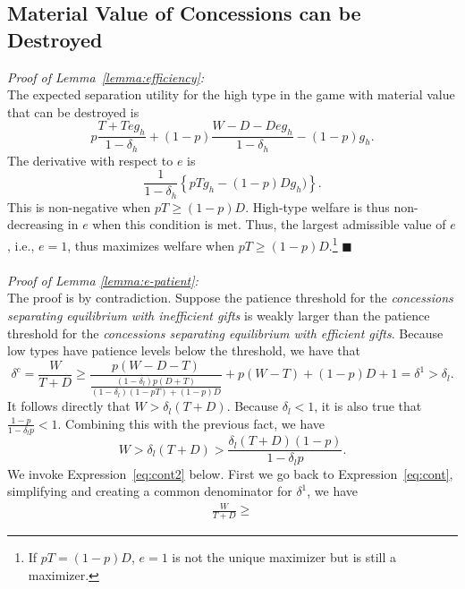 \documentclass[bibtex,autowc]{apsr_submission}
\newcommand{\de}{\delta}
\begin{document}
{\subsection{Material Value of Concessions can be Destroyed}
\emph{Proof of Lemma~\ref{lemma:efficiency}:}\\
The expected separation utility for the high type in the game with material value that can be destroyed is
$$p\frac{T+Teg_h}{1-\de_h} + (1-p)\frac{W-D-Deg_h}{1-\de_h} - (1-p)g_h.$$
The derivative with respect to $e$ is
$$\frac{1}{1-\de_h}\left\{pTg_h - (1-p)Dg_h)\right\}.$$
This is non-negative when $pT \geq (1-p)D$. High-type welfare is thus non-decreasing in $e$ when this condition is met. Thus, the largest admissible value of $e$, i.e., $e=1$, thus maximizes welfare when $pT \geq (1-p)D$.\footnote{If $pT = (1-p)D$, $e=1$ is not the unique maximizer but is still a maximizer.} \hfill $\blacksquare$\\
\\
\emph{Proof of Lemma \ref{lemma:e-patient}:}\\
The proof is by contradiction. Suppose the patience threshold for the \emph{concessions separating equilibrium with inefficient gifts} is weakly larger than the patience threshold for the \emph{concessions separating equilibrium with efficient gifts}. Because low types have patience levels below the threshold, we have that 
\begin{equation}
	\de^c = \frac{W}{T+D} \geq \frac{p(W-D-T)}{\frac{\left(1-\de_l\right)p\left(D +	 T\right)}{\left(1-\de_l\right)\left(1 - pT \right) + (1-p) D}} + p (W-T) + (1-p)D + 1 = \de^1> \de_l.
	\label{eq:cont}
\end{equation}
It follows directly that $W > \de_l(T+D)$. Because $\de_l < 1$, it is also true that $\frac{1-p}{1-\de_l p} < 1$. Combining this with the previous fact, we have
\begin{equation}
	W > \de_l(T+D) > \frac{\de_l(T+D)(1-p)}{1-\de_l p}.
	\label{eq:cont2}
\end{equation}
We invoke Expression~\ref{eq:cont2} below. First we go back to Expression~\ref{eq:cont}, simplifying and creating a common denominator for $\de^1$, we have
\begin{multline*}
	\frac{W}{T+D} \geq %

\end{multline*}}
\end{document}
